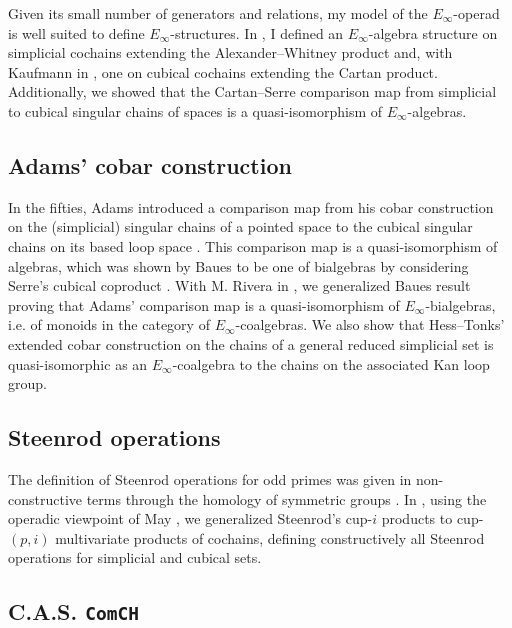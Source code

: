 Given its small number of generators and relations, my model of the $E_\infty$-operad is well suited to define $E_{\infty}$-structures.
In \cite{medina2020prop1}, I defined an $E_\infty$-algebra structure on simplicial cochains extending the Alexander--Whitney product and, with Kaufmann in \cite{medina2021cubical}, one on cubical cochains extending the Cartan product.
Additionally, we showed that the Cartan--Serre comparison map from simplicial to cubical singular chains of spaces is a quasi-isomorphism of $E_\infty$-algebras.

\subsection{Adams' cobar construction}

In the fifties, Adams introduced a comparison map from his cobar construction on the (simplicial) singular chains of a pointed space to the cubical singular chains on its based loop space \cite{adams1956cobar}.
This comparison map is a quasi-isomorphism of algebras, which was shown by Baues to be one of bialgebras by considering Serre's cubical coproduct \cite{baues1998hopf}.
With M. Rivera in \cite{medina2021cobar}, we generalized Baues result proving that Adams' comparison map is a quasi-isomorphism of $E_{\infty}$-bialgebras, i.e. of monoids in the category of $E_{\infty}$-coalgebras.
We also show that Hess--Tonks' extended cobar construction \cite{hess2010cobar} on the chains of a general reduced simplicial set is quasi-isomorphic as an $E_{\infty}$-coalgebra to the chains on the associated Kan loop group.

\subsection{Steenrod operations} \label{ss:may steenrod}

The definition of Steenrod operations for odd primes was given in non-constructive terms through the homology of symmetric groups \cite{steenrod1952reduced, steenrod1962cohomology}.
In \cite{medina2021maysteenrod}, using the operadic viewpoint of May \cite{may1970general}, we generalized Steenrod's cup-$i$ products to cup-$(p,i)$ multivariate products of cochains, defining constructively all Steenrod operations for simplicial and cubical sets.

\subsection{C.A.S. \texttt{ComCH}}

